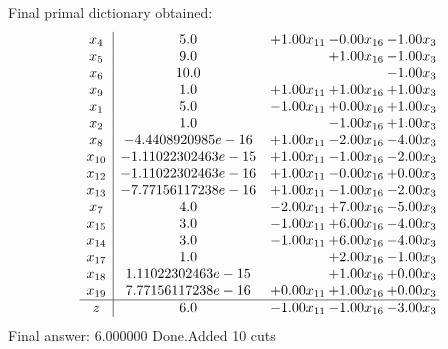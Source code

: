 \documentclass[8pt]{article}
\begin{document}
 Final primal dictionary obtained: 
\[\begin{array}{c| c c@{\hskip 2pt} c@{\hskip 2pt} c@{\hskip 2pt} }
 x_{4}   &  5.0 & +  1.00 x_{11} & -0.00 x_{16} & -1.00 x_{3}\\
 x_{5}   &  9.0  &   & +  1.00 x_{16} & -1.00 x_{3}\\
 x_{6}   &  10.0  &    &   & -1.00 x_{3}\\
 x_{9}   &  1.0 & +  1.00 x_{11} & +  1.00 x_{16} & +  1.00 x_{3}\\
 x_{1}   &  5.0 & -1.00 x_{11} & +  0.00 x_{16} & +  1.00 x_{3}\\
 x_{2}   &  1.0  &   & -1.00 x_{16} & +  1.00 x_{3}\\
 x_{8}   &  -4.4408920985e-16 & +  1.00 x_{11} & -2.00 x_{16} & -4.00 x_{3}\\
 x_{10}   &  -1.11022302463e-15 & +  1.00 x_{11} & -1.00 x_{16} & -2.00 x_{3}\\
 x_{12}   &  -1.11022302463e-16 & +  1.00 x_{11} & -0.00 x_{16} & +  0.00 x_{3}\\
 x_{13}   &  -7.77156117238e-16 & +  1.00 x_{11} & -1.00 x_{16} & -2.00 x_{3}\\
 x_{7}   &  4.0 & -2.00 x_{11} & +  7.00 x_{16} & -5.00 x_{3}\\
 x_{15}   &  3.0 & -1.00 x_{11} & +  6.00 x_{16} & -4.00 x_{3}\\
 x_{14}   &  3.0 & -1.00 x_{11} & +  6.00 x_{16} & -4.00 x_{3}\\
 x_{17}   &  1.0  &   & +  2.00 x_{16} & -1.00 x_{3}\\
 x_{18}   &  1.11022302463e-15  &   & +  1.00 x_{16} & +  0.00 x_{3}\\
 x_{19}   &  7.77156117238e-16 & +  0.00 x_{11} & +  1.00 x_{16} & +  0.00 x_{3}\\
\hline
z    &  6.0 & -1.00 x_{11} & -1.00 x_{16} & -3.00 x_{3}\\
\end{array}\]
 Final answer: 6.000000 
Done.Added 10 cuts 
\end{document}
